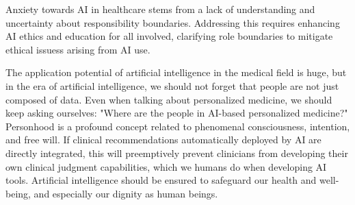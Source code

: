 \documentclass[paper=a4, fontsize=11pt]{scrartcl} %
\numberwithin{equation}{section} %
\numberwithin{figure}{section} %
\numberwithin{table}{section} %
\begin{document}
Anxiety towards AI in healthcare stems from a lack of understanding and uncertainty about responsibility boundaries. 
Addressing this requires enhancing AI ethics and education for all involved, clarifying role boundaries to mitigate 
ethical issuess arising from AI use. 

The application potential of artificial intelligence in the medical field is huge, but in the era of artificial intelligence, 
we should not forget that people are not just composed of data. Even when talking about personalized medicine, we should keep 
asking ourselves: "Where are the people in AI-based personalized medicine?"
Personhood is a profound concept related to phenomenal consciousness, intention, and free will. If clinical recommendations 
automatically deployed by AI are directly integrated, this will preemptively prevent clinicians from developing their own clinical 
judgment capabilities, which we humans do when developing AI tools.
Artificial intelligence should be ensured to safeguard our health and well-being, and especially our dignity as human beings.






















\end{document}
